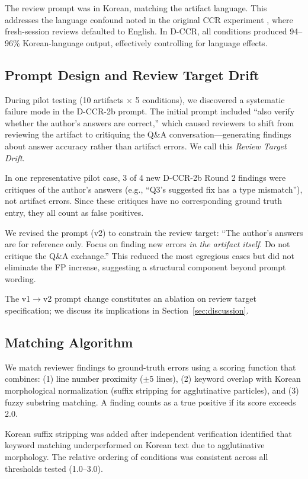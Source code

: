 \documentclass[11pt]{article}
\begin{document}
The review prompt was in Korean, matching the artifact language.
This addresses the language confound noted in the original CCR experiment \citep{song2026ccr}, where fresh-session reviews defaulted to English.
In D-CCR, all conditions produced 94--96\% Korean-language output, effectively controlling for language effects.

\subsection{Prompt Design and Review Target Drift}

During pilot testing (10 artifacts $\times$ 5 conditions), we discovered a systematic failure mode in the D-CCR-2b prompt.
The initial prompt included ``also verify whether the author's answers are correct,'' which caused reviewers to shift from reviewing the artifact to critiquing the Q\&A conversation---generating findings about answer accuracy rather than artifact errors.
We call this \emph{Review Target Drift}.

In one representative pilot case, 3 of 4 new D-CCR-2b Round 2 findings were critiques of the author's answers (e.g., ``Q3's suggested fix has a type mismatch''), not artifact errors.
Since these critiques have no corresponding ground truth entry, they all count as false positives.

We revised the prompt (v2) to constrain the review target: ``The author's answers are for reference only.
Focus on finding new errors \emph{in the artifact itself}.
Do not critique the Q\&A exchange.'' This reduced the most egregious cases but did not eliminate the FP increase, suggesting a structural component beyond prompt wording.

The v1$\to$v2 prompt change constitutes an ablation on review target specification; we discuss its implications in Section~\ref{sec:discussion}.

\subsection{Matching Algorithm}

We match reviewer findings to ground-truth errors using a scoring function that combines: (1) line number proximity ($\pm$5 lines), (2) keyword overlap with Korean morphological normalization (suffix stripping for agglutinative particles), and (3) fuzzy substring matching.
A finding counts as a true positive if its score exceeds 2.0.

Korean suffix stripping was added after independent verification identified that keyword matching underperformed on Korean text due to agglutinative morphology.
The relative ordering of conditions was consistent across all thresholds tested (1.0--3.0).
\end{document}
